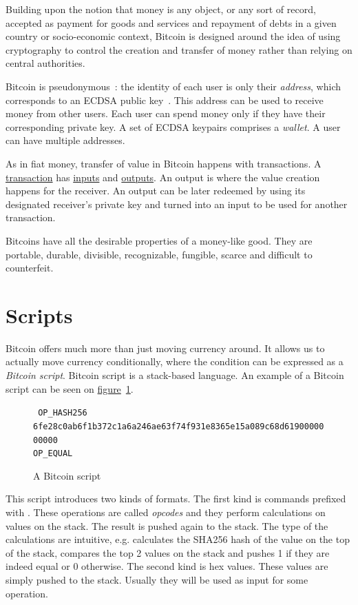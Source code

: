 Building upon the notion that money is any object, or any sort of record, accepted as payment for goods and services and repayment of debts in a given country or socio-economic context, Bitcoin is designed around the idea of using cryptography to control the creation and transfer of money rather than relying on central authorities.

Bitcoin is pseudonymous~\cite{gtklocker}: the identity of each user is only their \emph{address}, which corresponds to an ECDSA public key~\cite{ecdsa}. This address can be used to receive money from other users. Each user can spend money only if they have their corresponding private key. A set of ECDSA keypairs comprises a \emph{wallet}. A user can have multiple addresses.

As in fiat money, transfer of value in Bitcoin happens with transactions. A \hyperref[sec:transactions]{transaction} has \hyperref[sec:inputs]{inputs} and \hyperref[sec:outputs]{outputs}. An output is where the value creation happens for the receiver. An output can be later redeemed by using its designated receiver's private key and turned into an input to be used for another transaction.

Bitcoins have all the desirable properties of a money-like good. They are portable, durable, divisible, recognizable, fungible, scarce and difficult to counterfeit.

\section{Scripts}
Bitcoin offers much more than just moving currency around. It allows us to actually move currency conditionally, where the condition can be expressed as a \emph{Bitcoin script}. Bitcoin script is a stack-based language. An example of a Bitcoin script can be seen on \hyperref[fig:bitcoin-script]{figure}~\ref{fig:bitcoin-script}.

\begin{figure}[hb]
  \centering
  {
    \tt
    OP\_HASH256 \\
    6fe28c0ab6f1b372c1a6a246ae63f74f931e8365e15a089c68d6190000000000 \\
    OP\_EQUAL
  }
  \caption{A Bitcoin script~\cite{gtklocker}}
  \label{fig:bitcoin-script}
\end{figure}

This script introduces two kinds of formats. The first kind is commands prefixed with . These operations are called \emph{opcodes} and they perform calculations on values on the stack. The result is pushed again to the stack. The type of the calculations are intuitive, e.g.  calculates the SHA256 hash of the value on the top of the stack,  compares the top 2 values on the stack and pushes 1 if they are indeed equal or 0 otherwise. The second kind is hex values. These values are simply pushed to the stack. Usually they will be used as input for some operation.

